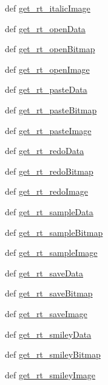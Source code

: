 \begin{DoxyCompactItemize}
def \hyperlink{namespaceimages_a0b6a05bcdf12bc98494dc8a565eab00d}{get\_\-rt\_\-italicImage}
\item 
def \hyperlink{namespaceimages_a35c4ddada89a26b7b25e9d3f047303e8}{get\_\-rt\_\-openData}
\item 
def \hyperlink{namespaceimages_a2a1526a25154f3524af104ac34927938}{get\_\-rt\_\-openBitmap}
\item 
def \hyperlink{namespaceimages_a71b67d208fcdae978594bf0820dda393}{get\_\-rt\_\-openImage}
\item 
def \hyperlink{namespaceimages_aa9b7314eecfda5eb25f1294b046e5d19}{get\_\-rt\_\-pasteData}
\item 
def \hyperlink{namespaceimages_a1fbbb8c3cb5e0cfc66917c859eda034a}{get\_\-rt\_\-pasteBitmap}
\item 
def \hyperlink{namespaceimages_af75cc235ed79c0398d99efd07f2e6549}{get\_\-rt\_\-pasteImage}
\item 
def \hyperlink{namespaceimages_acdfb1d9e1961db1221bf13c458b6f4c8}{get\_\-rt\_\-redoData}
\item 
def \hyperlink{namespaceimages_a4b04477cb5da857111d0e7c5fac11b03}{get\_\-rt\_\-redoBitmap}
\item 
def \hyperlink{namespaceimages_aa1c793c730e8cbbf3df88bcb861f1528}{get\_\-rt\_\-redoImage}
\item 
def \hyperlink{namespaceimages_a4548d73b14caad9e7d3b12445b317472}{get\_\-rt\_\-sampleData}
\item 
def \hyperlink{namespaceimages_a2a484f98d9221ac1c151578c36a619ef}{get\_\-rt\_\-sampleBitmap}
\item 
def \hyperlink{namespaceimages_a02ba870e29a00e5ba530e58816d6bcb6}{get\_\-rt\_\-sampleImage}
\item 
def \hyperlink{namespaceimages_a3698a0883c391b46b71fe8b81d9b7e2f}{get\_\-rt\_\-saveData}
\item 
def \hyperlink{namespaceimages_a9b7900080799b223abf46b178db359fb}{get\_\-rt\_\-saveBitmap}
\item 
def \hyperlink{namespaceimages_a7834ac79bc80d196491353232181cbde}{get\_\-rt\_\-saveImage}
\item 
def \hyperlink{namespaceimages_ae81a68479b537fb735d51668c65ac126}{get\_\-rt\_\-smileyData}
\item 
def \hyperlink{namespaceimages_a975b8b30ea22830594154441c1bd002a}{get\_\-rt\_\-smileyBitmap}
\item 
def \hyperlink{namespaceimages_a4661594ffc309f40a9f7e145cea898c4}{get\_\-rt\_\-smileyImage}
\item 

\end{DoxyCompactItemize}
